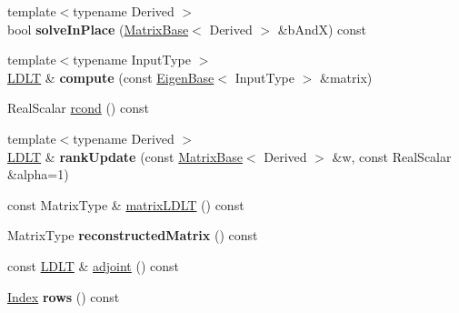 \begin{DoxyCompactItemize}
\item 
\mbox{\label{group___cholesky___module_ad1e3edadfa7a3969480cd17351af42c0}} 
{\footnotesize template$<$typename Derived $>$ }\\bool {\bfseries solve\+In\+Place} (\hyperlink{group___core___module_class_eigen_1_1_matrix_base}{Matrix\+Base}$<$ Derived $>$ \&b\+AndX) const
\item 
\mbox{\label{group___cholesky___module_aef70371f07bf006a85250bfaeed2f992}} 
{\footnotesize template$<$typename Input\+Type $>$ }\\\hyperlink{group___cholesky___module_class_eigen_1_1_l_d_l_t}{L\+D\+LT} \& {\bfseries compute} (const \hyperlink{group___core___module_struct_eigen_1_1_eigen_base}{Eigen\+Base}$<$ Input\+Type $>$ \&matrix)
\item 
Real\+Scalar \hyperlink{group___cholesky___module_ae646403fdde3a4b18e278a32c61a0953}{rcond} () const
\item 
\mbox{\label{group___cholesky___module_a1bdbfbf648360fdb49b8f88cf78b0558}} 
{\footnotesize template$<$typename Derived $>$ }\\\hyperlink{group___cholesky___module_class_eigen_1_1_l_d_l_t}{L\+D\+LT} \& {\bfseries rank\+Update} (const \hyperlink{group___core___module_class_eigen_1_1_matrix_base}{Matrix\+Base}$<$ Derived $>$ \&w, const Real\+Scalar \&alpha=1)
\item 
const Matrix\+Type \& \hyperlink{group___cholesky___module_aa5e0fd09dcd5251a8521fa248b95db0b}{matrix\+L\+D\+LT} () const
\item 
\mbox{\label{group___cholesky___module_a4827f1fd7bd96203190ad9f33609d668}} 
Matrix\+Type {\bfseries reconstructed\+Matrix} () const
\item 
const \hyperlink{group___cholesky___module_class_eigen_1_1_l_d_l_t}{L\+D\+LT} \& \hyperlink{group___cholesky___module_ac656a209860fa0c6a8faa8bb9f9a06ef}{adjoint} () const
\item 
\mbox{\label{group___cholesky___module_a96efc3befd020e2260ea1cb6f35769a2}} 
\hyperlink{group___cholesky___module_ad9c57eb2fb3bbccd51b9d2e111bea355}{Index} {\bfseries rows} () const
\item 
\mbox{\label{group___cholesky___module_ae848b7d0c0c7dfb3d029a875363c7848}} 

\end{DoxyCompactItemize}
